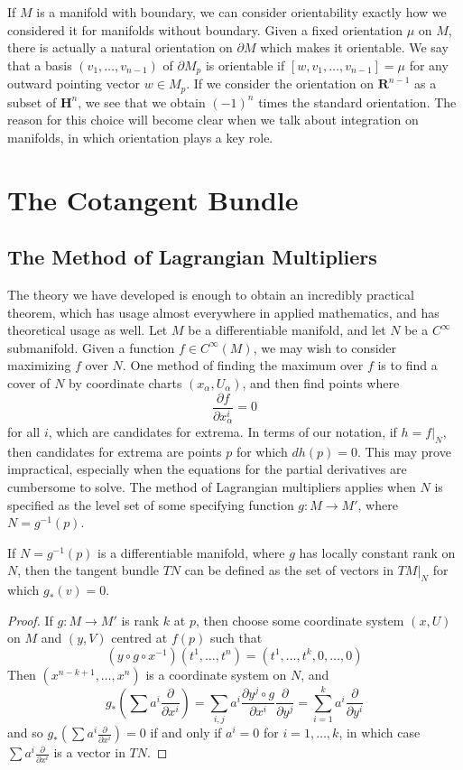 If $M$ is a manifold with boundary, we can consider orientability exactly how we considered it for manifolds without boundary. Given a fixed orientation $\mu$ on $M$, there is actually a natural orientation on $\partial M$ which makes it orientable. We say that a basis $(v_1, \dots, v_{n-1})$ of $\partial M_p$ is orientable if $[w, v_1, \dots, v_{n-1}] = \mu$ for any outward pointing vector $w \in M_p$. If we consider the orientation on $\mathbf{R}^{n-1}$ as a subset of $\mathbf{H}^n$, we see that we obtain $(-1)^n$ times the standard orientation. The reason for this choice will become clear when we talk about integration on manifolds, in which orientation plays a key role.

\chapter{The Cotangent Bundle}

\section{The Method of Lagrangian Multipliers}

The theory we have developed is enough to obtain an incredibly practical theorem, which has usage almost everywhere in applied mathematics, and has theoretical usage as well. Let $M$ be a differentiable manifold, and let $N$ be a $C^\infty$ submanifold. Given a function $f \in C^\infty(M)$, we may wish to consider maximizing $f$ over $N$. One method of finding the maximum over $f$ is to find a cover of $N$ by coordinate charts $(x_\alpha,U_\alpha)$, and then find points where
%
\[ \frac{\partial f}{\partial x^i_\alpha} = 0 \]
%
for all $i$, which are candidates for extrema. In terms of our notation, if $h = f|_N$, then candidates for extrema are points $p$ for which $dh(p) = 0$. This may prove impractical, especially when the equations for the partial derivatives are cumbersome to solve. The method of Lagrangian multipliers applies when $N$ is specified as the level set of some specifying function $g: M \to M'$, where $N = g^{-1}(p)$.

\begin{theorem}
    If $N = g^{-1}(p)$ is a differentiable manifold, where $g$ has locally constant rank on $N$, then the tangent bundle $TN$ can be defined as the set of vectors in $TM|_N$ for which $g_*(v) = 0$.
\end{theorem}
\begin{proof}
    If $g: M \to M'$ is rank $k$ at $p$, then choose some coordinate system $(x,U)$ on $M$ and $(y,V)$ centred at $f(p)$ such that
    \[ (y \circ g \circ x^{-1})(t^1, \dots, t^n) = (t^1, \dots, t^k, 0, \dots, 0) \]
    Then $(x^{n-k+1}, \dots, x^n)$ is a coordinate system on $N$, and
    \[ g_* \left( \sum a^i \frac{\partial}{\partial x^i} \right) = \sum_{i,j} a^i \frac{\partial y^j \circ g}{\partial x^i} \frac{\partial}{\partial y^j} = \sum_{i = 1}^k a^i \frac{\partial}{\partial y^i} \]
    and so $g_* \left(\sum a^i \frac{\partial}{\partial x^i} \right) = 0$ if and only if $a^i = 0$ for $i = 1, \dots, k$, in which case $\sum a^i \frac{\partial}{\partial x^i}$ is a vector in $TN$.
\end{proof}


